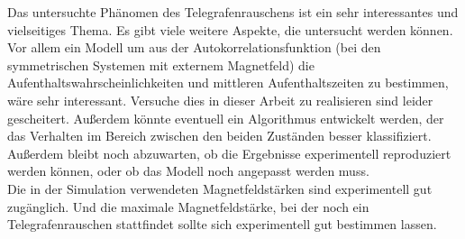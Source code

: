 \documentclass[main.tex]{subfiles}
\begin{document}
Das untersuchte Phänomen des Telegrafenrauschens ist ein sehr interessantes und vielseitiges Thema. Es gibt viele weitere Aspekte, die untersucht werden können.\\
Vor allem ein Modell um aus der Autokorrelationsfunktion (bei den symmetrischen Systemen mit externem Magnetfeld) die Aufenthaltswahrscheinlichkeiten und mittleren Aufenthaltszeiten zu bestimmen, wäre sehr interessant. Versuche dies in dieser Arbeit zu realisieren sind leider gescheitert.
Außerdem könnte eventuell ein Algorithmus entwickelt werden, der das Verhalten im Bereich zwischen den beiden Zuständen besser klassifiziert.\\
Außerdem bleibt noch abzuwarten, ob die Ergebnisse experimentell reproduziert werden können, oder ob das Modell noch angepasst werden muss.\\
Die in der Simulation verwendeten Magnetfeldstärken sind experimentell gut zugänglich. Und die maximale Magnetfeldstärke, bei der noch ein Telegrafenrauschen stattfindet sollte sich experimentell gut bestimmen lassen.\\ 
\end{document}
